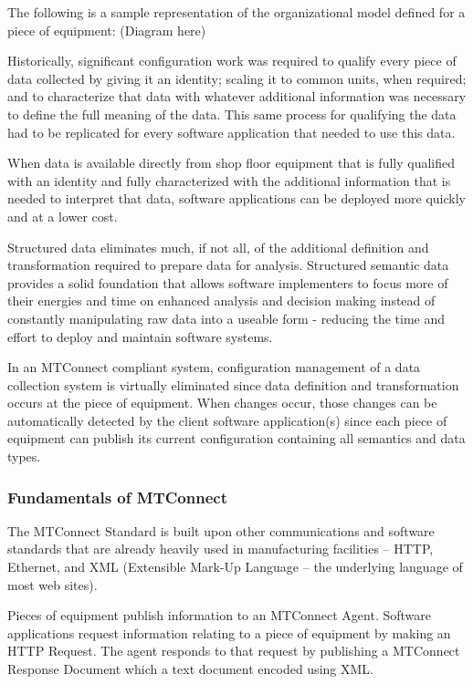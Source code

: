 The following is a sample representation of the organizational model defined for a piece of equipment: (Diagram here)

Historically, significant configuration work was required to qualify every piece of data collected by giving it an identity; scaling it to common units, when required; and to characterize that data with whatever additional information was necessary to define the full meaning of the data.   This same process for qualifying the data had to be replicated for every software application that needed to use this data.    

When data is available directly from shop floor equipment that is fully qualified with an identity and fully characterized with the additional information that is needed to interpret that data, software applications can be deployed more quickly and at a lower cost.    

Structured data eliminates much, if not all, of the additional definition and transformation required to prepare data for analysis.   Structured semantic data provides a solid foundation that allows software implementers to focus more of their energies and time on enhanced analysis and decision making instead of constantly manipulating raw data into a useable form - reducing the time and effort to deploy and maintain software systems.  
 
In an MTConnect compliant system, configuration management of a data collection system is virtually eliminated since data definition and transformation occurs at the piece of equipment.   When changes occur, those changes can be automatically detected by the client software application(s) since each piece of equipment can publish its current configuration containing all semantics and data types.

\subsubsection{Fundamentals of MTConnect}

The MTConnect Standard is built upon other communications and software standards that are already heavily used in manufacturing facilities – HTTP, Ethernet, and XML (Extensible Mark-Up Language – the underlying language of most web sites).
 
Pieces of equipment publish information to an MTConnect Agent.  Software applications request information relating to a piece of equipment by making an HTTP Request. The agent responds to that request by publishing a MTConnect Response Document which a text document encoded using XML.   
 
